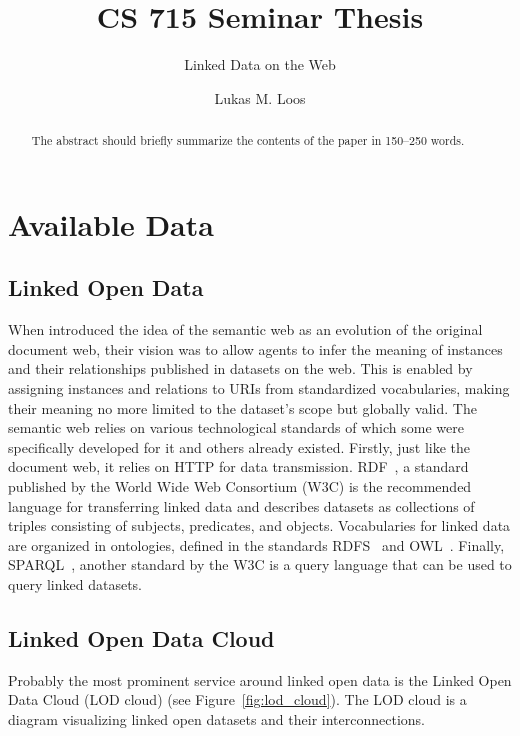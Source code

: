 \documentclass[runningheads]{llncs}
\begin{document}
%
    \title{CS 715 Seminar Thesis}
    \subtitle{Linked Data on the Web}
%
%
    \author{Lukas M. Loos}
%
%
%
    \maketitle              %
%
    \begin{abstract}
        The abstract should briefly summarize the contents of the paper in
        150--250 words.

    \end{abstract}
%
%
%


    \section{Available Data}

    \subsection{Linked Open Data}
    When \citet{berners2001semantic} introduced the idea of the semantic web as an evolution of the original document web, their vision was to allow agents to infer the meaning of instances and their relationships published in datasets on the web.
    This is enabled by assigning instances and relations to URIs from standardized vocabularies, making their meaning no more limited to the dataset's scope but globally valid.
    The semantic web relies on various technological standards of which some were specifically developed for it and others already existed.
    Firstly, just like the document web, it relies on HTTP for data transmission.
    RDF~\citep{RDF}, a standard published by the World Wide Web Consortium (W3C) is the recommended language for transferring linked data and describes datasets as collections of triples consisting of subjects, predicates, and objects.
    Vocabularies for linked data are organized in ontologies, defined in the standards RDFS~\citep{RDFS} and OWL~\citep{OWL}.
    Finally, SPARQL~\citep{SPARQL}, another standard by the W3C is a query language that can be used to query linked datasets.

    \subsection{Linked Open Data Cloud}
    Probably the most prominent service around linked open data is the Linked Open Data Cloud (LOD cloud)
    \footnotemark{} (see Figure~\ref{fig:lod_cloud}).
    The LOD cloud is a diagram visualizing linked open datasets and their interconnections.
\end{document}

